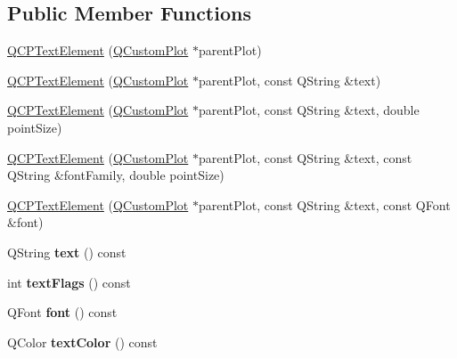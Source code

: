 \subsection*{Public Member Functions}
\begin{DoxyCompactItemize}
\item 
\mbox{\hyperlink{class_q_c_p_text_element_ae1de18bdb1e7ba959f132018dd9a0258}{Q\+C\+P\+Text\+Element}} (\mbox{\hyperlink{class_q_custom_plot}{Q\+Custom\+Plot}} $\ast$parent\+Plot)
\item 
\mbox{\hyperlink{class_q_c_p_text_element_a00f08a8a3363ad8d7d12ca0db4922b6b}{Q\+C\+P\+Text\+Element}} (\mbox{\hyperlink{class_q_custom_plot}{Q\+Custom\+Plot}} $\ast$parent\+Plot, const Q\+String \&text)
\item 
\mbox{\hyperlink{class_q_c_p_text_element_a2684e65def4a5daf80be9f5f149ca9b2}{Q\+C\+P\+Text\+Element}} (\mbox{\hyperlink{class_q_custom_plot}{Q\+Custom\+Plot}} $\ast$parent\+Plot, const Q\+String \&text, double point\+Size)
\item 
\mbox{\hyperlink{class_q_c_p_text_element_adb4bcd3743dbfabfedee4fe9c2ee93da}{Q\+C\+P\+Text\+Element}} (\mbox{\hyperlink{class_q_custom_plot}{Q\+Custom\+Plot}} $\ast$parent\+Plot, const Q\+String \&text, const Q\+String \&font\+Family, double point\+Size)
\item 
\mbox{\hyperlink{class_q_c_p_text_element_a00b75787b77b39bbd083813c2a7b2520}{Q\+C\+P\+Text\+Element}} (\mbox{\hyperlink{class_q_custom_plot}{Q\+Custom\+Plot}} $\ast$parent\+Plot, const Q\+String \&text, const Q\+Font \&font)
\item 
\mbox{\label{class_q_c_p_text_element_a453c24723b76fdcae405a8a7b0d02614}} 
Q\+String {\bfseries text} () const
\item 
\mbox{\label{class_q_c_p_text_element_a1937ed3b7454d7e815f6027895a7d480}} 
int {\bfseries text\+Flags} () const
\item 
\mbox{\label{class_q_c_p_text_element_a9247189a1c2b2bf5604645a7396b2ddc}} 
Q\+Font {\bfseries font} () const
\item 
\mbox{\label{class_q_c_p_text_element_a4b906c81abb94517500dbdb2fe9c22b9}} 
Q\+Color {\bfseries text\+Color} () const
\item 
\mbox{\label{class_q_c_p_text_element_a7119d960bdf57df74f9bcc748d2a0b43}} 

\end{DoxyCompactItemize}
